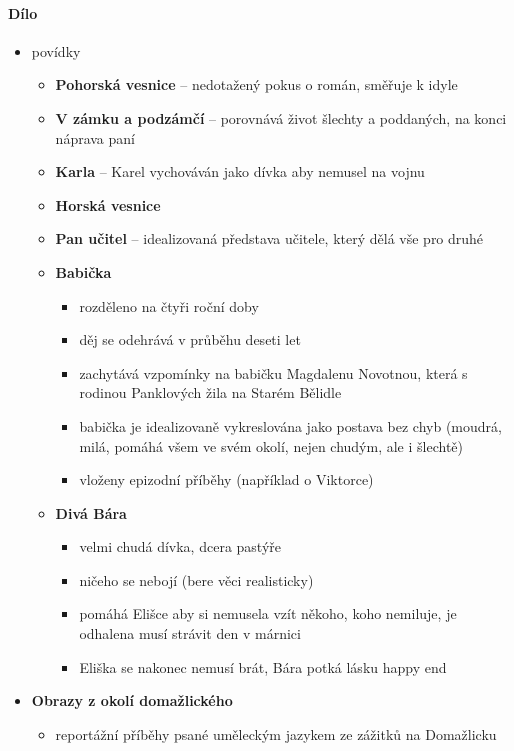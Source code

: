 \paragraph{Dílo}
\begin{itemize}
\item povídky 
	\begin{itemize}
	\item \textbf{Pohorská vesnice} -- nedotažený pokus o román, směřuje k idyle
	\item \textbf{V zámku a podzámčí} -- porovnává život šlechty a poddaných, na konci náprava paní
	\item \textbf{Karla} -- Karel vychováván jako dívka aby nemusel na vojnu
	\item \textbf{Horská vesnice}
	\item \textbf{Pan učitel} -- idealizovaná představa učitele, který dělá vše pro druhé
	\item \textbf{Babička}
		\begin{itemize}
		\item rozděleno na čtyři roční doby
		\item děj se odehrává v průběhu deseti let
		\item zachytává vzpomínky na babičku Magdalenu Novotnou, která s rodinou Panklových žila na Starém Bělidle
		\item babička je idealizovaně vykreslována jako postava bez chyb (moudrá, milá, pomáhá všem ve svém okolí, nejen chudým, ale i šlechtě)
		\item vloženy epizodní příběhy (například o Viktorce)
		\end{itemize}

	\item \textbf{Divá Bára}
		\begin{itemize}
		\item velmi chudá dívka, dcera pastýře
		\item ničeho se nebojí (bere věci realisticky)
		\item pomáhá Elišce aby si nemusela vzít někoho, koho nemiluje, je odhalena \ra musí strávit den v márnici
		\item Eliška se nakonec nemusí brát, Bára potká lásku \ra happy end
		\end{itemize}
	\end{itemize}
\item \textbf{Obrazy z okolí domažlického}
	\begin{itemize}
	\item reportážní příběhy psané uměleckým jazykem ze zážitků na Domažlicku
	\end{itemize}
\end{itemize}

